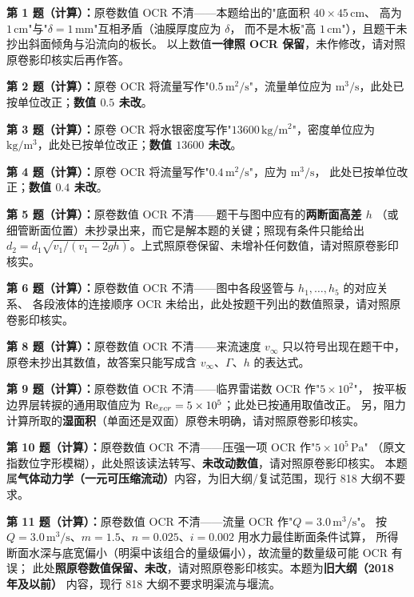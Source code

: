 \begin{tishi}
\textbf{第 1 题（计算）：}原卷数值 OCR 不清——本题给出的"底面积 $40\times45\,\mathrm{cm}$、
高为 $1\,\mathrm{cm}$"与"$\delta=1\,\mathrm{mm}$"互相矛盾（油膜厚度应为 $\delta$，
而不是木板"高 $1\,\mathrm{cm}$"），且题干未抄出斜面倾角与沿流向的板长。
以上数值\textbf{一律照 OCR 保留}，未作修改，请对照原卷影印核实后再作答。

\textbf{第 2 题（计算）：}原卷 OCR 将流量写作"$0.5\,\mathrm{m^2/s}$"，流量单位应为
$\mathrm{m^3/s}$，此处已按单位改正；\textbf{数值 $0.5$ 未改}。

\textbf{第 3 题（计算）：}原卷 OCR 将水银密度写作"$13600\,\mathrm{kg/m^2}$"，密度单位应为
$\mathrm{kg/m^3}$，此处已按单位改正；\textbf{数值 $13600$ 未改}。

\textbf{第 4 题（计算）：}原卷 OCR 将流量写作"$0.4\,\mathrm{m^2/s}$"，应为 $\mathrm{m^3/s}$，
此处已按单位改正；\textbf{数值 $0.4$ 未改}。

\textbf{第 5 题（计算）：}原卷数值 OCR 不清——题干与图中应有的\textbf{两断面高差 $h$}
（或细管断面位置）未抄录出来，而它是解本题的关键；照现有条件只能给出
$d_2=d_1\sqrt{v_1/(v_1-2gh)}$。上式照原卷保留、未增补任何数值，请对照原卷影印核实。

\textbf{第 6 题（计算）：}原卷数值 OCR 不清——图中各段竖管与 $h_1,\dots,h_5$ 的对应关系、
各段液体的连接顺序 OCR 未给出，此处按题干列出的数值照录，请对照原卷影印核实。

\textbf{第 8 题（计算）：}原卷数值 OCR 不清——来流速度 $v_\infty$ 只以符号出现在题干中，
原卷未抄出其数值，故答案只能写成含 $v_\infty$、$\Gamma$、$h$ 的表达式。

\textbf{第 9 题（计算）：}原卷数值 OCR 不清——临界雷诺数 OCR 作"$5\times10^{2}$"，
按平板边界层转捩的通用取值应为 $\mathrm{Re}_{xcr}=5\times10^{5}$；此处已按通用取值改正。
另，阻力计算所取的\textbf{湿面积}（单面还是双面）原卷未明确，请对照原卷影印核实。

\textbf{第 10 题（计算）：}原卷数值 OCR 不清——压强一项 OCR 作"$5\times10^{5}\,\mathrm{Pa}$"
（原文指数位字形模糊），此处照该读法转写、\textbf{未改动数值}，请对照原卷影印核实。
本题属\textbf{气体动力学（一元可压缩流动）}内容，为旧大纲/复试范围，现行 818 大纲不要求。

\textbf{第 11 题（计算）：}原卷数值 OCR 不清——流量 OCR 作"$Q=3.0\,\mathrm{m^3/s}$"。
按 $Q=3.0\,\mathrm{m^3/s}$、$m=1.5$、$n=0.025$、$i=0.002$ 用水力最佳断面条件试算，
所得断面水深与底宽偏小（明渠中该组合的量级偏小），故流量的数量级可能 OCR 有误；
此处\textbf{照原卷数值保留、未改}，请对照原卷影印核实。本题为\textbf{旧大纲（2018 年及以前）}
内容，现行 818 大纲不要求明渠流与堰流。
\end{tishi}
